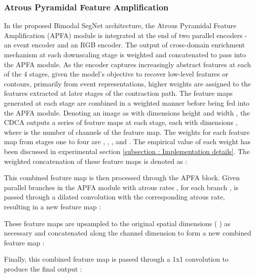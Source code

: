 \documentclass[lettersize,journal]{IEEEtran}
\begin{document}
\subsubsection{\textbf{Atrous Pyramidal Feature Amplification}}
\label{subsubsection : Atrous Pyramidal Feature Amplification}


In the proposed Bimodal SegNet architecture, the Atrous Pyramidal Feature Amplification (APFA) module is integrated at the end of two parallel encoders - an event encoder and an RGB encoder. The output of cross-domain enrichment mechanism  at each downscaling stage is weighted and concatenated to pass into the APFA module. As the encoder captures increasingly abstract features at each of the 4 stages, given the model's objective to recover low-level features or contours, primarily from event representations, higher weights are assigned to the features extracted at later stages of the contraction path. The feature maps generated at each stage are combined in a weighted manner before being fed into the APFA module. Denoting an image as  with dimensions height  and width , the CDCA outputs a series of feature maps  at each stage, each with dimensions , where  is the number of channels of the feature map. The weights for each feature map from stages one to four are , , , and . The empirical value of each weight has been discussed in experimental section \ref{subsection : Implementation details}. The weighted concatenation of these feature maps is denoted as :





This combined feature map  is then processed through the APFA block. Given  parallel branches in the APFA module with atrous rates , for each branch ,  is passed through a dilated convolution with the corresponding atrous rate, resulting in a new feature map :




These feature maps are upsampled to the original spatial dimensions ( ) as necessary and concatenated along the channel dimension to form a new combined feature map :




Finally, this combined feature map is passed through a 1x1 convolution to produce the final output :
\end{document}
